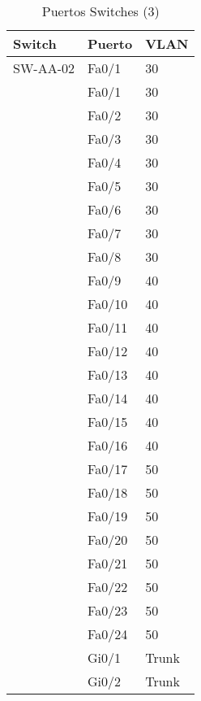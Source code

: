 \documentclass[a4paper,onecolumn,11pt]{article}
\begin{document}
\begin{table}[htbp]
\small \sffamily
\caption{Puertos Switches (3)}
\begin{center}
\begin{tabular}{p{}p{}p{}}
\toprule
\textbf{Switch} & \textbf{Puerto} & \textbf{VLAN}  \\
\toprule
SW-AA-02 & Fa0/1 & 30 \\ %
& Fa0/1 & 30\\
& Fa0/2 & 30\\
& Fa0/3 & 30\\
& Fa0/4 & 30\\
& Fa0/5 & 30\\
& Fa0/6 & 30\\
& Fa0/7 & 30\\
& Fa0/8 & 30\\
& Fa0/9 & 40\\
& Fa0/10 & 40\\
& Fa0/11 & 40\\
& Fa0/12 & 40\\
& Fa0/13 & 40\\
& Fa0/14 & 40\\
& Fa0/15 & 40\\
& Fa0/16 & 40\\
& Fa0/17 & 50\\
& Fa0/18 & 50\\
& Fa0/19 & 50\\
& Fa0/20 & 50\\
& Fa0/21 & 50\\
& Fa0/22 & 50\\
& Fa0/23 & 50\\
& Fa0/24 & 50\\
& Gi0/1 & Trunk  \\
& Gi0/2 & Trunk  \\ 
\bottomrule
\end{tabular}
\end{center}
\label{tab:puertos3}
\end{table}
\end{document}
